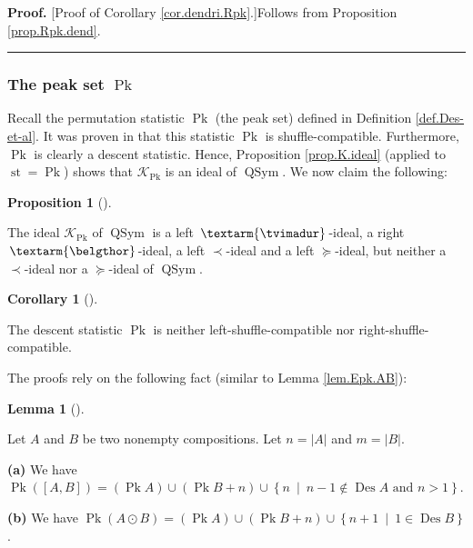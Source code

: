 \documentclass[numbers=enddot,12pt,final,onecolumn,notitlepage]{scrartcl}%
\theoremstyle{definition}
\newtheorem{lem}[theo]{Lemma}
\newenvironment{lemma}[1][]
{\begin{lem}[#1]\begin{leftbar}}
{\end{leftbar}\end{lem}}
\newtheorem{prop}[theo]{Proposition}
\newenvironment{proposition}[1][]
{\begin{prop}[#1]\begin{leftbar}}
{\end{leftbar}\end{prop}}
\newtheorem{coro}[theo]{Corollary}
\newenvironment{corollary}[1][]
{\begin{coro}[#1]\begin{leftbar}}
{\end{leftbar}\end{coro}}
\newenvironment{proof}[1][Proof]{\noindent\textbf{#1.} }{\ \rule{0.5em}{0.5em}}
\newenvironment{verlong}{}{}
\newcommand{\tvi}{\left. \textarm{\tvimadur} \right.}
\newcommand{\bel}{\left. \textarm{\belgthor} \right.}
\begin{document}
\begin{verlong}
\begin{proof}
[Proof of Corollary \ref{cor.dendri.Rpk}.]Follows from Proposition
\ref{prop.Rpk.dend}.
\end{proof}

\subsubsection{The peak set $\operatorname*{Pk}$}

Recall the permutation statistic $\operatorname*{Pk}$ (the peak set) defined
in Definition \ref{def.Des-et-al}. It was proven in \cite[Theorem 4.7
\textbf{(a)}]{part1} that this statistic $\operatorname*{Pk}$ is
shuffle-compatible. Furthermore, $\operatorname*{Pk}$ is clearly a descent
statistic. Hence, Proposition \ref{prop.K.ideal} (applied to
$\operatorname*{st}=\operatorname*{Pk}$) shows that $\mathcal{K}%
_{\operatorname*{Pk}}$ is an ideal of $\operatorname*{QSym}$. We now claim the following:

\begin{proposition}
\label{prop.Pk.dend}The ideal $\mathcal{K}_{\operatorname*{Pk}}$ of
$\operatorname*{QSym}$ is a left $\tvi$-ideal, a right $\bel$-ideal, a left
$\left.  \prec\right.  $-ideal and a left $\left.  \succeq\right.  $-ideal,
but neither a $\left.  \prec\right.  $-ideal nor a $\left.  \succeq\right.
$-ideal of $\operatorname*{QSym}$.
\end{proposition}

\begin{corollary}
\label{cor.dendri.Pk}The descent statistic $\operatorname*{Pk}$ is neither
left-shuffle-compatible nor right-shuffle-compatible.
\end{corollary}

The proofs rely on the following fact (similar to Lemma \ref{lem.Epk.AB}):

\begin{lemma}
\label{lem.Pk.AB}Let $A$ and $B$ be two nonempty compositions. Let
$n=\left\vert A\right\vert $ and $m=\left\vert B\right\vert $.

\textbf{(a)} We have $\operatorname*{Pk}\left(  \left[  A,B\right]  \right)
=\left(  \operatorname*{Pk}A\right)  \cup\left(  \operatorname*{Pk}B+n\right)
\cup\left\{  n\ \mid\ n-1\notin\operatorname*{Des}A\text{ and }n>1\right\}  $.

\textbf{(b)} We have $\operatorname*{Pk}\left(  A\odot B\right)  =\left(
\operatorname*{Pk}A\right)  \cup\left(  \operatorname*{Pk}B+n\right)
\cup\left\{  n+1\ \mid\ 1\in\operatorname*{Des}B\right\}  $.
\end{lemma}


\end{verlong}
\end{document}
